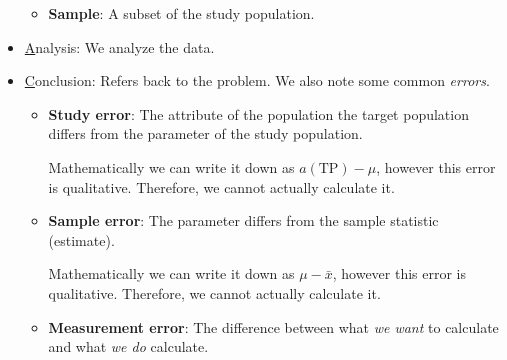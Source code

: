 \begin{itemize}
\begin{itemize}
\begin{Example}{}{}
                    \end{Example}
              \item \textbf{Sample}: A subset of the study population.
          \end{itemize}
    \item \underline{A}nalysis: We analyze the data.
    \item \underline{C}onclusion: Refers back to the problem. We also
          note some common \emph{errors}.
          \begin{itemize}
              \item \textbf{Study error}: The attribute of the population the
                    target population differs from the parameter of the study population.
                    \begin{Example}{}{}
                        Mathematically we can write it down as $ a(\text{TP})-\mu $,
                        however this error is qualitative. Therefore, we cannot
                        actually calculate it.
                    \end{Example}
              \item \textbf{Sample error}: The parameter differs from the
                    sample statistic (estimate).
                    \begin{Example}{}{}
                        Mathematically we can write it down as $ \mu-\bar{x} $,
                        however this error is qualitative. Therefore, we cannot
                        actually calculate it.
                    \end{Example}
              \item \textbf{Measurement error}: The difference
                    between what \emph{we want} to calculate and what \emph{we do}
                    calculate.
          \end{itemize}
\end{itemize}

